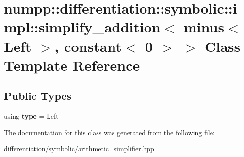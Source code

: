 \hypertarget{classnumpp_1_1differentiation_1_1symbolic_1_1impl_1_1simplify__addition_3_01minus_3_01Left_01_4_00_01constant_3_010_01_4_01_4}{}\section{numpp\+:\+:differentiation\+:\+:symbolic\+:\+:impl\+:\+:simplify\+\_\+addition$<$ minus$<$ Left $>$, constant$<$ 0 $>$ $>$ Class Template Reference}
\label{classnumpp_1_1differentiation_1_1symbolic_1_1impl_1_1simplify__addition_3_01minus_3_01Left_01_4_00_01constant_3_010_01_4_01_4}
\subsection*{Public Types}
\begin{DoxyCompactItemize}
\item 
\mbox{\label{classnumpp_1_1differentiation_1_1symbolic_1_1impl_1_1simplify__addition_3_01minus_3_01Left_01_4_00_01constant_3_010_01_4_01_4_ab1dc2894453329bce21026c08c9e0ca1}} 
using {\bfseries type} = Left
\end{DoxyCompactItemize}


The documentation for this class was generated from the following file\+:\begin{DoxyCompactItemize}
\item 
differentiation/symbolic/arithmetic\+\_\+simplifier.\+hpp\end{DoxyCompactItemize}
